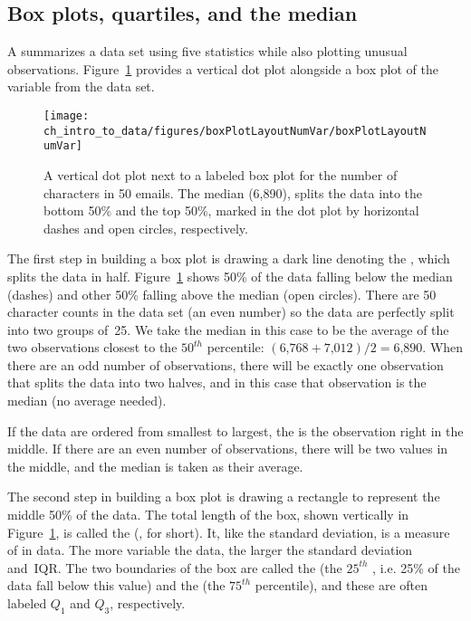 \subsection{Box plots, quartiles, and the median}

A  summarizes a data set using five statistics while also plotting unusual observations. Figure~\ref{boxPlotLayoutNumVar} provides a vertical dot plot alongside a box plot of the  variable from the  data set.

\begin{figure}[h]
   \centering
   \texttt{[image: ch\_intro\_to\_data/figures/boxPlotLayoutNumVar/boxPlotLayoutNumVar]}
   \caption{A vertical dot plot next to a labeled box plot for the number of characters in 50 emails. The median (6,890), splits the data into the bottom 50\% and the top 50\%, marked in the dot plot by horizontal dashes and open circles, respectively.}
   \label{boxPlotLayoutNumVar}
\end{figure}

The first step in building a box plot is drawing a dark line denoting the , which splits the data in half. Figure~\ref{boxPlotLayoutNumVar} shows 50\% of the data falling below the median (dashes) and other 50\% falling above the median (open circles). There are 50 character counts in the data set (an even number) so the data are perfectly split into two groups of~25. We take the median in this case to be the average of the two observations closest to the $50^{th}$ percentile: $(\text{6,768} + \text{7,012}) / 2 = \text{6,890}$. When there are an odd number of observations, there will be exactly one observation that splits the data into two halves, and in this case that observation is the median (no average needed).

\begin{termBox}{
If the data are ordered from smallest to largest, the  is the observation right in the middle. If there are an even number of observations, there will be two values in the middle, and the median is taken as their average.}
\end{termBox}

The second step in building a box plot is drawing a rectangle to represent the middle 50\% of the data. The total length of the box, shown vertically in Figure~\ref{boxPlotLayoutNumVar}, is called the  (, for short). It, like the standard deviation, is a measure of  in data. The more variable the data, the larger the standard deviation and~IQR. The two boundaries of the box are called the   (the $25^{th}$ , i.e. 25\% of the data fall below this value) and the   (the $75^{th}$ percentile), and these are often labeled $Q_1$  and $Q_3$, respectively.

